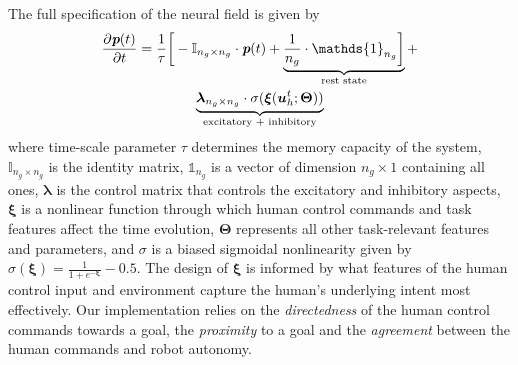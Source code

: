 \documentclass[letterpaper, 10 pt, conference]{ieeeconf}  %
\begin{document}
The full specification of the neural field is given by
\begin{multline}\label{eq:dft}
	\frac{\partial \textit{\textbf{p}}(t)}{\partial t} = \frac{1}{\tau}\bigg[-\mathbb{I}_{n_g\times n_g}\cdot\textit{\textbf{p}}(t) + \underbrace{\frac{1}{n_g}\cdot\mathds{1}_{n_g}\bigg]}_{\text{rest state}} + \\ \underbrace{\boldsymbol{\lambda}_{n_g\times n_g}\cdot\sigma(\boldsymbol{\xi}(\boldsymbol{u}_h^t;\boldsymbol{\Theta}))}_{\text{excitatory + inhibitory}}
\end{multline}
where time-scale parameter $\tau$ determines the memory capacity of the system, $\mathbb{I}_{n_g\times n_g}$ is the identity matrix, $\mathds{1}_{n_g}$ is a vector of dimension $n_g \times 1$ containing all ones, $\boldsymbol{\lambda}$ is the control matrix that controls the excitatory and inhibitory aspects, $\boldsymbol{\xi}$ is a nonlinear function through which human control commands and task features affect the time evolution, $\boldsymbol{\Theta}$ represents all other task-relevant features and parameters, and $\sigma$ is a biased sigmoidal nonlinearity given by $\sigma(\boldsymbol{\xi}) = \frac{1}{1 + e^{-\boldsymbol{\xi}}} - 0.5$. 
The design of $\boldsymbol{\xi}$ is informed by what features of the human control input and environment capture the human's underlying intent most effectively. Our implementation relies on the \textit{directedness} of the human control commands towards a goal, the \textit{proximity} to a goal and the \textit{agreement} between the human commands and robot autonomy.
\end{document}
